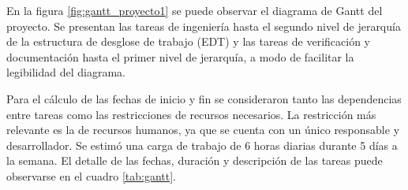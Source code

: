 \documentclass[
11pt, %
]{charter}
\begin{document}
En la figura \ref{fig:gantt_proyecto1} se puede observar el diagrama de Gantt del proyecto. Se presentan las tareas de ingeniería hasta el segundo nivel de jerarquía de la estructura de desglose de trabajo (EDT) y las tareas de verificación y documentación hasta el primer nivel de jerarquía, a modo de facilitar la legibilidad del diagrama. 

Para el cálculo de las fechas de inicio y fin se consideraron tanto las dependencias entre tareas como las restricciones de recursos necesarios. La restricción más relevante es la de recursos humanos, ya que se cuenta con un único responsable y desarrollador. Se estimó una carga de trabajo de 6 horas diarias durante 5 días a la semana. El detalle de las fechas, duración y descripción de las tareas puede observarse en el cuadro \ref{tab:gantt}.

\end{document}
